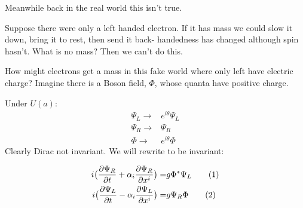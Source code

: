 \documentclass[]{article}
\newcommand\numberthis{\addtocounter{equation}{1}\tag{\theequation}}
\begin{document}
 Meanwhile back in the real world this isn't true.
 
 Suppose there were only a left handed electron. If it has mass we could slow it down, bring it to rest, then send it back- handedness has changed although spin hasn't. What is no mass? Then we can't do this.
 
 How might electrons get a mass in this fake world where only left have electric charge? Imagine there is a Boson field, $\Phi$, whose quanta have positive charge.
 
 Under $U(a)$:
 \begin{align*}
 	\Psi_L \rightarrow& e^{i\theta} \Psi_L\\
 	\Psi_R \rightarrow& \Psi_R\\
 	\Phi \rightarrow& e^{i\theta} \Phi
 \end{align*}
 Clearly Dirac not invariant. We will rewrite to be invariant:
 
 \begin{align*}
	 i \big(\frac{\partial \Psi_R}{\partial t} + \alpha_i \frac{\partial \Psi_R}{\partial 	x^i}\big) =& g \Phi^* \Psi_L \numberthis \label{eq:mod:Dirac:R}\\
	 i \big(\frac{\partial \Psi_L}{\partial t} - \alpha_i \frac{\partial \Psi_L}{\partial 	x^i}\big) =& g \Psi_R \Phi \numberthis \label{eq:mod:Dirac:L}
 \end{align*}
 
\end{document}
